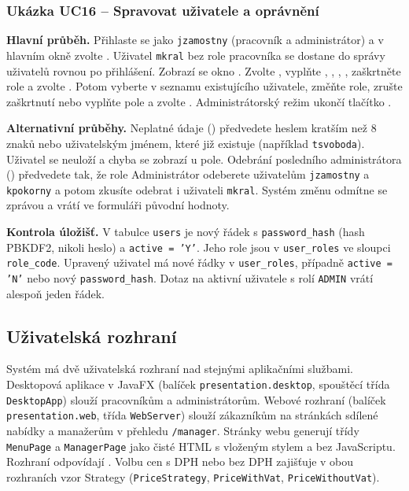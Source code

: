 \subsubsection{Ukázka UC16 -- Spravovat uživatele a oprávnění}

\textbf{Hlavní průběh.} Přihlaste se jako \texttt{jzamostny} (pracovník a administrátor) a v hlavním okně zvolte . Uživatel \texttt{mkral} bez role pracovníka se dostane do správy uživatelů rovnou po přihlášení. Zobrazí se okno . Zvolte , vyplňte , , , , zaškrtněte role a zvolte . Potom vyberte v seznamu existujícího uživatele, změňte role, zrušte zaškrtnutí  nebo vyplňte pole  a zvolte . Administrátorský režim ukončí tlačítko .

\textbf{Alternativní průběhy.} Neplatné údaje () předvedete heslem kratším než 8 znaků nebo uživatelským jménem, které již existuje (například \texttt{tsvoboda}). Uživatel se neuloží a chyba se zobrazí u pole. Odebrání posledního administrátora () předvedete tak, že role Administrátor odeberete uživatelům \texttt{jzamostny} a \texttt{kpokorny} a potom zkusíte odebrat i uživateli \texttt{mkral}. Systém změnu odmítne se zprávou  a vrátí ve formuláři původní hodnoty.

\textbf{Kontrola úložišť.} V tabulce \texttt{users} je nový řádek s \texttt{password\_hash} (hash PBKDF2, nikoli heslo) a \texttt{active = 'Y'}. Jeho role jsou v \texttt{user\_roles} ve sloupci \texttt{role\_code}. Upravený uživatel má nové řádky v \texttt{user\_roles}, případně \texttt{active = 'N'} nebo nový \texttt{password\_hash}. Dotaz na aktivní uživatele s rolí \texttt{ADMIN} vrátí alespoň jeden řádek.

\subsection{Uživatelská rozhraní}\label{sec:impl:ui}

Systém má dvě uživatelská rozhraní nad stejnými aplikačními službami. Desktopová aplikace v JavaFX (balíček \texttt{presentation.desktop}, spouštěcí třída \texttt{DesktopApp}) slouží pracovníkům a administrátorům. Webové rozhraní (balíček \texttt{presentation.web}, třída \texttt{WebServer}) slouží zákazníkům na stránkách sdílené nabídky a manažerům v přehledu \texttt{/manager}. Stránky webu generují třídy \texttt{MenuPage} a \texttt{ManagerPage} jako čisté HTML s vloženým stylem a bez JavaScriptu. Rozhraní odpovídají . Volbu cen s DPH nebo bez DPH zajišťuje v obou rozhraních vzor Strategy (\texttt{PriceStrategy}, \texttt{PriceWithVat}, \texttt{PriceWithoutVat}).


